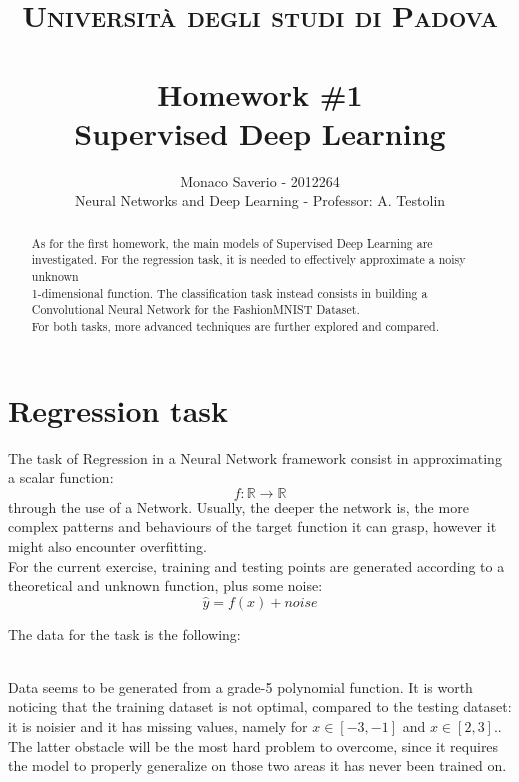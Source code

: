 \documentclass[11pt,a4paper,twocolumn]{IEEEtran}
\author{Monaco Saverio - 2012264 \sepline \\Neural Networks and Deep Learning - Professor: A. Testolin}
\title{{\normalsize\textsc{Università degli studi di Padova}}\vspace{-.5cm} \\ \sepline\\ \textbf{Homework \#1
\\ Supervised Deep Learning}}
\begin{document}
	\maketitle
	\begin{abstract} As for the first homework, the main models of Supervised Deep Learning are investigated. For the regression task, it is needed to effectively approximate a noisy unknown\\ 1-dimensional function. The classification task instead consists in building a Convolutional Neural Network for the FashionMNIST Dataset.\\
	For both tasks, more advanced techniques are further explored and compared.
	\end{abstract}
			\section{\textbf{Regression task}}
			The task of Regression in a Neural Network framework consist in approximating a scalar function:
			$$f:\mathbb{R}\to\mathbb{R}$$
			through the use of a Network. Usually, the deeper the network is, the more complex patterns and behaviours of the target function it can grasp, however it might also encounter overfitting.\\
			 For the current exercise, training and testing points are generated according to a theoretical and unknown function, plus some noise:
			$$\hat{y}=f(x) + noise$$
			
			The data for the task is the following:\vspace*{-.5cm}
			\begin{figure}[h]
				\centering
				
			\end{figure}\\
			Data seems to be generated from a grade-5 polynomial function. It is worth noticing that the training dataset is not optimal, compared to the testing dataset: it is noisier and it has missing values, namely for $x\in[-3,-1]$ and $x\in[2,3]$..\\
			The latter obstacle will be the most hard problem to overcome, since it requires the model to properly generalize on those two areas it has never been trained on.
\end{document}
